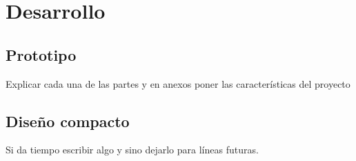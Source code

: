 \chapter{Desarrollo\label{sec:desarrollo}}

\section{Prototipo}

Explicar cada una de las partes y en anexos poner las características del proyecto

\section{Diseño compacto}

Si da tiempo escribir algo y sino dejarlo para líneas futuras.